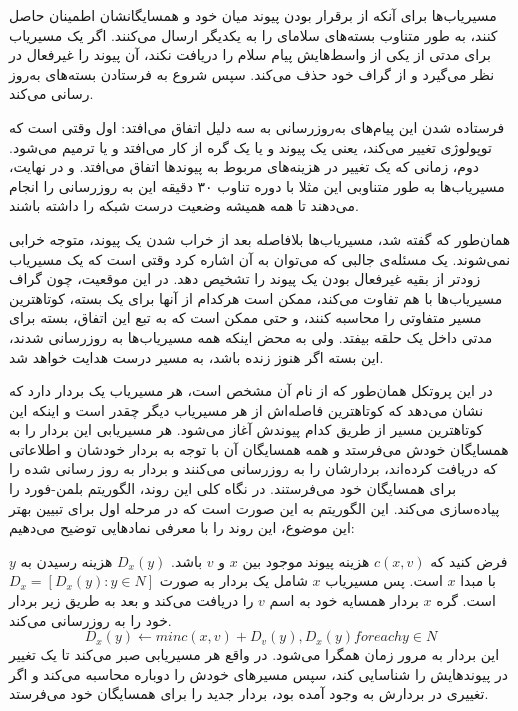 مسیریاب‌ها برای آنکه از برقرار بودن پیوند میان خود و همسایگانشان اطمینان حاصل کنند، به طور متناوب بسته‌های سلامای را به یکدیگر ارسال می‌کنند. اگر یک مسیریاب برای مدتی از یکی از واسط‌هایش پیام سلام را دریافت نکند، آن پیوند را غیرفعال در نظر می‌گیرد و از گراف خود حذف می‌کند. سپس شروع به فرستادن بسته‌های به‌روز رسانی می‌کند. 
 
فرستاده شدن این پیام‌های به‌روزرسانی به سه دلیل اتفاق می‌افتد: اول وقتی است که توپولوژی تغییر می‌کند، یعنی یک پیوند و یا یک گره از کار می‌افتد و یا ترمیم می‌شود. دوم، زمانی که یک تغییر در هزینه‌های مربوط به پیوند‌ها اتفاق می‌افتد. و در نهایت، مسیریاب‌ها به طور متناوبی این مثلا با دوره تناوب ۳۰ دقیقه این به روزرسانی را انجام می‌دهند تا همه همیشه وضعیت درست شبکه را داشته باشند.  

همان‌طور که گفته شد، مسیریاب‌ها بلافاصله بعد از خراب شدن یک پیوند، متوجه خرابی نمی‌شوند.  یک مسئله‌ی جالبی که می‌توان به آن اشاره کرد وقتی است که یک مسیریاب زودتر از بقیه غیرفعال بودن یک پیوند را تشخیص دهد. در این موقعیت، چون گراف مسیریاب‌ها با هم تفاوت می‌‌کند، ممکن است هرکدام از آنها برای یک بسته، کوتاهترین مسیر متفاوتی را محاسبه کنند، و حتی ممکن است که به تبع این اتفاق، بسته برای مدتی داخل یک حلقه بیفتد. ولی به محض اینکه همه مسیریاب‌ها به روزرسانی شدند، این بسته اگر هنوز زنده باشد، به مسیر درست هدایت خواهد شد. 
 
در این پروتکل همان‌طور که از نام آن مشخص است، هر مسیریاب یک بردار دارد که نشان می‌دهد که کوتاهترین فاصله‌‌اش از هر مسیریاب دیگر چقدر است و اینکه این کوتاهترین مسیر از طریق کدام پیوندش آغاز می‌شود. هر مسیریابی این بردار را به همسایگان خودش می‌فرستد و همه همسایگان آن با توجه به بردار خودشان و اطلاعاتی که دریافت کرده‌اند، بردارشان را به روزرسانی می‌‌کنند و بردار به روز رسانی شده را برای همسایگان خود می‌فرستند. در نگاه کلی این روند، الگوریتم بلمن-فورد را پیاده‌سازی می‌‌کند. این الگوریتم به این صورت است که در مرحله اول 
برای تبیین بهتر این موضوع، این روند را با معرفی نمادهایی توضیح می‌دهیم:‌

فرض کنید که $c(x,v)$ هزینه پیوند موجود بین $x$ و $v$ باشد. $D_{x}(y)$ هزینه رسیدن به $y$ با مبدا $x$ است. پس مسیریاب $x$ شامل یک بردار به صورت $D_{x}=[D_{x}(y):y\in N]$ است. گره $x$ بردار همسایه خود به اسم $v$  را دریافت می‌‌کند و بعد به طریق زیر بردار خود را به 
روزرسانی می‌کند. $$D_{x}(y) \leftarrow min{c(x,v) + D_{v}(y), D_{x}(y)} for each y \in N$$
این بردار به مرور زمان همگرا می‌شود. در واقع هر مسیریابی صبر می‌کند تا یک تغییر در پیوند‌هایش را شناسایی کند، سپس مسیرهای خودش را دوباره محاسبه می‌‌کند و اگر تغییری در بردارش به وجود آمده بود، بردار جدید را برای همسایگان خود می‌فرستد. 

   
